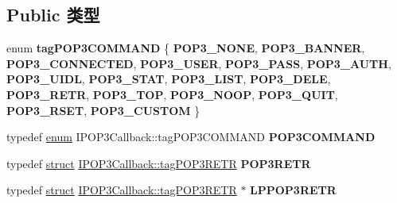 \subsection*{Public 类型}
\begin{DoxyCompactItemize}
\item 
\mbox{\label{interface_i_p_o_p3_callback_ae234a7533a0f62ac642c4d806b3fb0b2}} 
enum {\bfseries tag\+P\+O\+P3\+C\+O\+M\+M\+A\+ND} \{ \newline
{\bfseries P\+O\+P3\+\_\+\+N\+O\+NE}, 
{\bfseries P\+O\+P3\+\_\+\+B\+A\+N\+N\+ER}, 
{\bfseries P\+O\+P3\+\_\+\+C\+O\+N\+N\+E\+C\+T\+ED}, 
{\bfseries P\+O\+P3\+\_\+\+U\+S\+ER}, 
\newline
{\bfseries P\+O\+P3\+\_\+\+P\+A\+SS}, 
{\bfseries P\+O\+P3\+\_\+\+A\+U\+TH}, 
{\bfseries P\+O\+P3\+\_\+\+U\+I\+DL}, 
{\bfseries P\+O\+P3\+\_\+\+S\+T\+AT}, 
\newline
{\bfseries P\+O\+P3\+\_\+\+L\+I\+ST}, 
{\bfseries P\+O\+P3\+\_\+\+D\+E\+LE}, 
{\bfseries P\+O\+P3\+\_\+\+R\+E\+TR}, 
{\bfseries P\+O\+P3\+\_\+\+T\+OP}, 
\newline
{\bfseries P\+O\+P3\+\_\+\+N\+O\+OP}, 
{\bfseries P\+O\+P3\+\_\+\+Q\+U\+IT}, 
{\bfseries P\+O\+P3\+\_\+\+R\+S\+ET}, 
{\bfseries P\+O\+P3\+\_\+\+C\+U\+S\+T\+OM}
 \}
\item 
\mbox{\label{interface_i_p_o_p3_callback_a5f9e345bf8511aa690f56c265677cbc8}} 
typedef \hyperlink{interfaceenum}{enum} I\+P\+O\+P3\+Callback\+::tag\+P\+O\+P3\+C\+O\+M\+M\+A\+ND {\bfseries P\+O\+P3\+C\+O\+M\+M\+A\+ND}
\item 
\mbox{\label{interface_i_p_o_p3_callback_a67931684b1064d2ba89b8b55ba9c4110}} 
typedef \hyperlink{interfacestruct}{struct} \hyperlink{struct_i_p_o_p3_callback_1_1tag_p_o_p3_r_e_t_r}{I\+P\+O\+P3\+Callback\+::tag\+P\+O\+P3\+R\+E\+TR} {\bfseries P\+O\+P3\+R\+E\+TR}
\item 
\mbox{\label{interface_i_p_o_p3_callback_a18a3f6c08286260f7d1a99e98c895493}} 
typedef \hyperlink{interfacestruct}{struct} \hyperlink{struct_i_p_o_p3_callback_1_1tag_p_o_p3_r_e_t_r}{I\+P\+O\+P3\+Callback\+::tag\+P\+O\+P3\+R\+E\+TR} $\ast$ {\bfseries L\+P\+P\+O\+P3\+R\+E\+TR}
\item 
\mbox{\label{interface_i_p_o_p3_callback_a33745d38e79fbcded0eb176f7a7c362c}} 

\end{DoxyCompactItemize}
